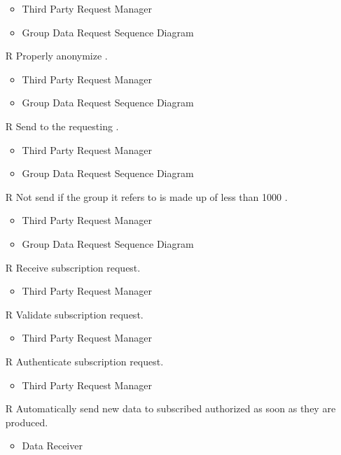 \begin{itemize}
	\begin{itemize}
		\item Third Party Request Manager
		\item Group Data Request Sequence Diagram
	\end{itemize}
	\item[R\subs{23}]Properly anonymize .
	\begin{itemize}
		\item Third Party Request Manager
		\item Group Data Request Sequence Diagram
	\end{itemize}
	\item[R\subs{24}]Send  to the requesting .
	\begin{itemize}
		\item Third Party Request Manager
		\item Group Data Request Sequence Diagram
	\end{itemize}
	\item[R\subs{25}]Not send  if the group it refers to is made up of less than 1000 .
	\begin{itemize}
		\item Third Party Request Manager
		\item Group Data Request Sequence Diagram
	\end{itemize}
	\item[R\subs{26}]Receive  subscription request.
	\begin{itemize}
		\item Third Party Request Manager
	\end{itemize}
	\item[R\subs{27}]Validate  subscription request.
	\begin{itemize}
		\item Third Party Request Manager
	\end{itemize}
	\item[R\subs{28}]Authenticate  subscription request.
	\begin{itemize}
		\item Third Party Request Manager
	\end{itemize}
	\item[R\subs{29}]Automatically send new data to subscribed authorized  as soon as they are produced.
	\begin{itemize}
		\item Data Receiver

\end{itemize}
\end{itemize}
